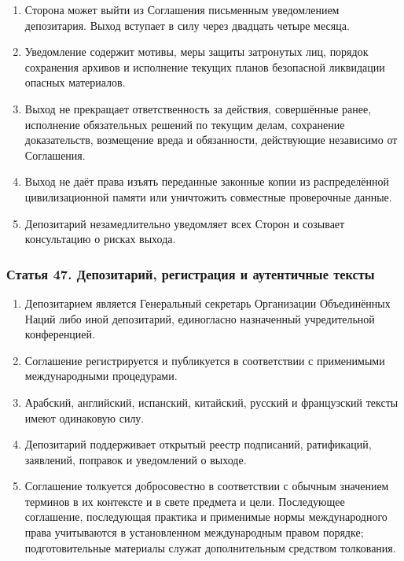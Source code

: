 \documentclass[
  russian,
  11pt,
  a4paper,
]{article}
\providecommand{\tightlist}{%
  \setlength{\itemsep}{0pt}\setlength{\parskip}{0pt}}
\begin{document}
\begin{enumerate}
\def\labelenumi{\arabic{enumi}.}
\tightlist
\item
  Сторона может выйти из Соглашения письменным уведомлением депозитария.
  Выход вступает в силу через двадцать четыре месяца.
\item
  Уведомление содержит мотивы, меры защиты затронутых лиц, порядок
  сохранения архивов и исполнение текущих планов безопасной ликвидации
  опасных материалов.
\item
  Выход не прекращает ответственность за действия, совершённые ранее,
  исполнение обязательных решений по текущим делам, сохранение
  доказательств, возмещение вреда и обязанности, действующие независимо
  от Соглашения.
\item
  Выход не даёт права изъять переданные законные копии из распределённой
  цивилизационной памяти или уничтожить совместные проверочные данные.
\item
  Депозитарий незамедлительно уведомляет всех Сторон и созывает
  консультацию о рисках выхода.
\end{enumerate}

\subsubsection{Статья 47. Депозитарий, регистрация и аутентичные
тексты}\label{ux441ux442ux430ux442ux44cux44f-47-ux434ux435ux43fux43eux437ux438ux442ux430ux440ux438ux439-ux440ux435ux433ux438ux441ux442ux440ux430ux446ux438ux44f-ux438-ux430ux443ux442ux435ux43dux442ux438ux447ux43dux44bux435-ux442ux435ux43aux441ux442ux44b}

\begin{enumerate}
\def\labelenumi{\arabic{enumi}.}
\tightlist
\item
  Депозитарием является Генеральный секретарь Организации Объединённых
  Наций либо иной депозитарий, единогласно назначенный учредительной
  конференцией.
\item
  Соглашение регистрируется и публикуется в соответствии с применимыми
  международными процедурами.
\item
  Арабский, английский, испанский, китайский, русский и французский
  тексты имеют одинаковую силу.
\item
  Депозитарий поддерживает открытый реестр подписаний, ратификаций,
  заявлений, поправок и уведомлений о выходе.
\item
  Соглашение толкуется добросовестно в соответствии с обычным значением
  терминов в их контексте и в свете предмета и цели. Последующее
  соглашение, последующая практика и применимые нормы международного
  права учитываются в установленном международным правом порядке;
  подготовительные материалы служат дополнительным средством толкования.
\end{enumerate}
\end{document}
